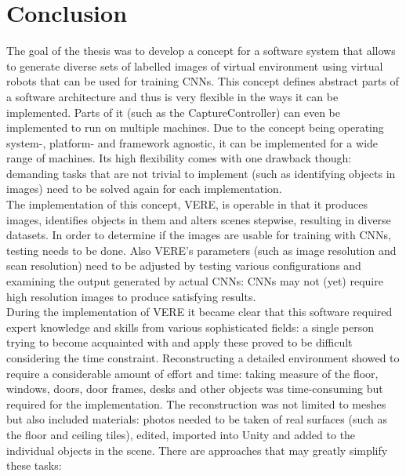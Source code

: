 \chapter{Conclusion}
\label{chap:conclusion}
The goal of the thesis was to develop a concept for a software system that allows to generate diverse sets of labelled images of virtual environment using virtual robots that can be used for training \acp{CNN}. This concept defines abstract parts of a software architecture and thus is very flexible in the ways it can be implemented. Parts of it (such as the CaptureController) can even be implemented to run on multiple machines. Due to the concept being operating system-, platform- and framework agnostic, it can be implemented for a wide range of machines. Its high flexibility comes with one drawback though: demanding tasks that are not trivial to implement (such as identifying objects in images) need to be solved again for each implementation.\\
The implementation of this concept, \ac{VERE}, is operable in that it produces images, identifies objects in them and alters scenes stepwise, resulting in diverse datasets. In order to determine if the images are usable for training with \acp{CNN}, testing needs to be done. Also \ac{VERE}'s parameters (such as image resolution and scan resolution) need to be adjusted by testing various configurations and examining the output generated by actual \acp{CNN}: \acp{CNN} may not (yet) require high resolution images to produce satisfying results.\\
During the implementation of \ac{VERE} it became clear that this software required expert knowledge and skills from various sophisticated fields: a single person trying to become acquainted with and apply these proved to be difficult considering the time constraint. Reconstructing a detailed environment showed to require a considerable amount of effort and time: taking measure of the floor, windows, doors, door frames, desks and other objects was time-consuming but required for the implementation. The reconstruction was not limited to meshes but also included materials: photos needed to be taken of real surfaces (such as the floor and ceiling tiles), edited, imported into Unity and added to the individual objects in the scene. There are approaches that may greatly simplify these tasks:
